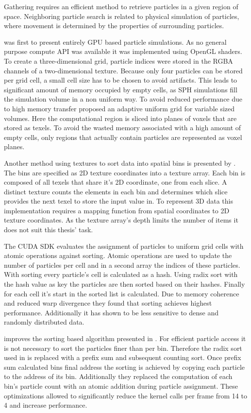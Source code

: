 \documentclass[hyperref,german,diplominf]{cgvpub}
\begin{document}
Gathering requires an efficient method to retrieve particles in a given region of space. Neighboring particle search is related to physical simulation of particles, where movement is determined by the properties of surrounding particles.

\cite{11} was first to present entirely GPU based particle simulations. As no general purpose compute API was available it was implemented using OpenGL shaders. To create a three-dimensional grid, particle indices were stored in the RGBA channels of a two-dimensional texture. Because only four particles can be stored per grid cell, a small cell size has to be chosen to avoid artifacts. This leads to significant amount of memory occupied by empty cells, as SPH simulations fill the simulation volume in a non uniform way. To avoid reduced performance due to high memory transfer  \cite{6} proposed an adaptive uniform grid for variable sized volumes. Here the computational region is sliced into planes of voxels that are stored as texels. To avoid the wasted memory associated with a high amount of empty cells, only regions that actually contain particles are represented as voxel planes.

Another method using textures to sort data into spatial bins is presented by  \cite{14}. The bins are specified as 2D texture coordinates into a texture array. Each bin is composed of all texels that share it's 2D coordinate, one from each slice. A distinct texture counts the elements in each bin and determines which slice provides the next texel to store the input value in. To represent 3D data this implementation requires a mapping function from spatial coordinates to 2D texture coordinates. As the texture array's depth limits the number of items it does not suit this thesis' task.

The CUDA SDK \cite{5} evaluates the assignment of particles to uniform grid cells with atomic operations against sorting. Atomic operations are used to update the number of particles per cell and in a second array the indices of these particles. With sorting every particle's cell is calculated as a hash. Using radix sort with the hash value as key the particles are then sorted based on their hashes. Finally for each cell it's start in the sorted list is calculated. Due to memory coherence and reduced warp divergence they found that sorting achieves highest performance. Additionally it has shown to be less sensitive to dense and randomly distributed data.

\cite{13} improves the sorting based algorithm presented in \cite{5}. For efficient particle access it is not necessary to sort the particles finer than per bin. Therefore the radix sort used in \cite{5} is replaced with a prefix sum and subsequent counting sort. Once prefix sum calculated bins final address the sorting is achieved by copying each particle to the address of its bin. Additionally they replaced the computation of each bin's particle count with an atomic addition during particle assignment. These optimizations allowed to significantly reduce the kernel calls per frame from 14 to 4 and increase performance.
\end{document}
